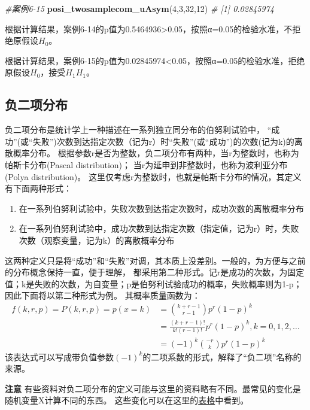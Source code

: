 \documentclass[
]{article}
\newenvironment{Shaded}{\begin{snugshade}}{\end{snugshade}}
\newcommand{\CommentTok}[1]{\textcolor[rgb]{0.56,0.35,0.01}{\textit{#1}}}
\newcommand{\DecValTok}[1]{\textcolor[rgb]{0.00,0.00,0.81}{#1}}
\newcommand{\KeywordTok}[1]{\textcolor[rgb]{0.13,0.29,0.53}{\textbf{#1}}}
\newcommand{\NormalTok}[1]{#1}
\providecommand{\tightlist}{%
  \setlength{\itemsep}{0pt}\setlength{\parskip}{0pt}}
\begin{document}
\begin{Shaded}
\begin{Highlighting}[]
\CommentTok{#案例6-15}
\KeywordTok{posi_twosamplecom_uAsym}\NormalTok{(}\DecValTok{4}\NormalTok{,}\DecValTok{3}\NormalTok{,}\DecValTok{32}\NormalTok{,}\DecValTok{12}\NormalTok{)}
\CommentTok{# [1] 0.02845974}
\end{Highlighting}
\end{Shaded}

根据计算结果，案例6-14的p值为0.5464936\textgreater0.05，按照α=0.05的检验水准，不拒绝原假设\(H_0\)。

根据计算结果，案例6-15的p值为0.02845974\textless0.05，按照α=0.05的检验水准，拒绝原假设\(H_0\)，接受\(H_1H_1\)。

\hypertarget{ux8d1fux4e8cux9879ux5206ux5e03}{%
\subsection{负二项分布}\label{ux8d1fux4e8cux9879ux5206ux5e03}}

负二项分布是统计学上一种描述在一系列独立同分布的伯努利试验中，
``成功''(或``失败'')次数到达指定次数（记为r）时``失败''(或``成功'')的次数(记为k)的离散概率分布。
根据参数r是否为整数，负二项分布有两种，当r为整数时，也称为帕斯卡分布(Pascal distribution)；
当r为延申到非整数时，也称为波利亚分布(Polya distribution)。
这里仅考虑r为整数时，也就是帕斯卡分布的情况，其定义有下面两种形式：

\begin{enumerate}
\def\labelenumi{\arabic{enumi}.}
\tightlist
\item
  在一系列伯努利试验中，失败次数到达指定次数时，成功次数的离散概率分布
\item
  在一系列伯努利试验中，成功次数到达指定次数（指定值，记为r）时，失败次数（观察变量，记为k）的离散概率分布
\end{enumerate}

这两种定义只是将``成功''和``失败''对调，其本质上没差别。一般的，为方便与之前的分布概念保持一直，便于理解，
都采用第二种形式。记r是成功的次数，为固定值；k是失败的次数，为自变量；p是伯努利试验成功的概率，失败概率则为1-p；因此下面将以第二种形式为例。
其概率质量函数为：
\[\begin{aligned}
f(k,r,p)=P(k,r,p)=p(x=k) & = \binom{k+r-1}{r-1}p^r(1-p)^k\\
& = \frac{(k+r-1)!}{k!(r-1)!}p^r(1-p)^k ,k=0,1,2,\dots\\
& = (-1)^k\binom{-r}{k}p^r(1-p)^k
\end{aligned}\]
该表达式可以写成带负值参数\((-1)^k\)的二项系数的形式，解释了``负二项''名称的来源。

\textbf{注意}
有些资料对负二项分布的定义可能与这里的资料略有不同。最常见的变化是随机变量X计算不同的东西。
这些变化可以在这里的\href{https://en.wikipedia.org/wiki/Negative_binomial_distribution\#Alternative_formulations}{表格}中看到。
\end{document}
